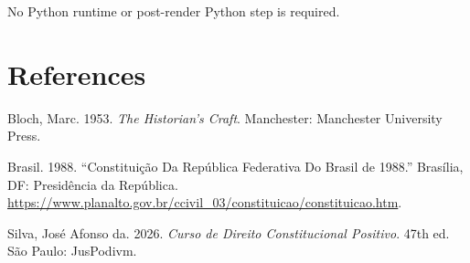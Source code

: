 \documentclass[
  letterpaper,
  DIV=11,
  numbers=noendperiod]{scrartcl}
\newlength{\cslhangindent}
\newenvironment{CSLReferences}[2] %
 {\begin{list}{}{%
  \setlength{\itemindent}{0pt}
  \setlength{\leftmargin}{0pt}
  \setlength{\parsep}{0pt}
  \ifodd #1
   \setlength{\leftmargin}{\cslhangindent}
   \setlength{\itemindent}{-1\cslhangindent}
  \fi
  \setlength{\itemsep}{#2\baselineskip}}}
 {\end{list}}
\begin{document}
No Python runtime or post-render Python step is required.

\section*{References}\label{references}

\label{refs}
\begin{CSLReferences}{1}{0}
Bloch, Marc. 1953. \emph{The Historian's Craft}. Manchester: Manchester
University Press.

Brasil. 1988. {``Constituição Da República Federativa Do Brasil de
1988.''} Brasília, DF: Presidência da República.
\url{https://www.planalto.gov.br/ccivil_03/constituicao/constituicao.htm}.

Silva, José Afonso da. 2026. \emph{Curso de Direito Constitucional
Positivo}. 47th ed. São Paulo: JusPodivm.

\end{CSLReferences}
\end{document}

